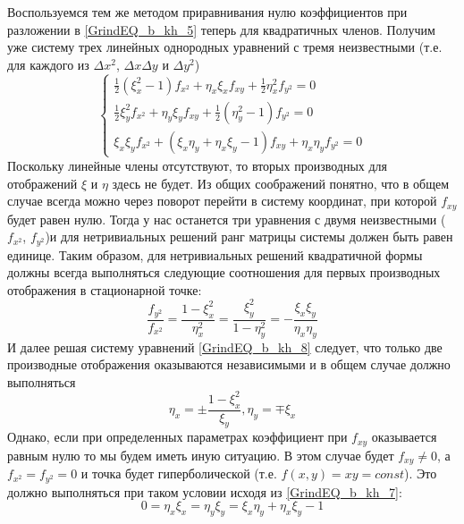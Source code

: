 \documentclass[a4paper]{article}
\begin{document}
	Воспользуемся тем же методом приравнивания нулю коэффициентов при разложении в \eqref{GrindEQ_b_kh_5} теперь для квадратичных членов. Получим уже систему трех линейных однородных уравнений с тремя неизвестными (т.е. для каждого из $\Delta x^2$, $\Delta x\Delta y$ и $\Delta y^2$)
\begin{equation} \label{GrindEQ_b_kh_7}
\begin{cases} \frac{1}{2} (\xi _x^2-1)f_{x^2}+\eta_x \xi_x f_{xy}+\frac{1}{2}\eta _x^2 f_{y^2}=0\\
\frac{1}{2} \xi _y^2 f_{x^2} + \eta_y \xi_y f_{xy}+\frac{1}{2}(\eta _y^2-1)f_{y^2}=0 \\
\xi_x \xi_y f_{x^2}+(\xi_x \eta_y+\eta_x \xi_y-1)f_{xy}+\eta_x \eta_y f_{y^2} =0
\end{cases}
\end{equation}
Поскольку линейные члены отсутствуют, то вторых производных для отображений $\xi$ и $\eta$ здесь не будет. Из общих соображений понятно, что в общем случае всегда можно через поворот перейти в систему координат, при которой $f_{xy}$ будет равен нулю. Тогда у нас останется три уравнения с двумя неизвестными ($f_{x^2}$, $f_{y^2}$)и для нетривиальных решений ранг матрицы системы должен быть равен единице. Таким образом, для нетривиальных решений квадратичной формы должны всегда выполняться следующие соотношения для первых производных отображения в стационарной точке:
\begin{equation} \label{GrindEQ_b_kh_8}
\frac{f_{y^2}}{f_{x^2}}=\frac{1-\xi _x^2}{\eta_x^2}=\frac{\xi_y^2}{1-\eta_y^2}=-\frac{\xi_x \xi_y}{\eta_x \eta_y}
\end{equation}
 И далее решая систему уравнений \eqref{GrindEQ_b_kh_8} следует, что только две  производные отображения оказываются независимыми и в общем случае должно выполняться
\begin{equation} \label{GrindEQ_b_kh_10}
\eta _x= \pm\frac{1-\xi _x^2}{\xi _y},\eta_y= \mp\xi_x
\end{equation}
Однако, если при определенных параметрах коэффициент при $f_{xy}$ оказывается равным нулю то мы будем иметь иную ситуацию. В этом случае будет $f_{xy}\neq0$, а $f_{x^2}=f_{y^2}=0$ и точка будет гиперболической (т.е. $f(x,y)=xy=const$).
Это должно выполняться при таком условии исходя из \eqref{GrindEQ_b_kh_7}:
\begin{equation} \label{GrindEQ_b_kh_9}
0=\eta_x \xi_x=\eta _y \xi _y=\xi _x \eta_y+\eta_x \xi_y-1
\end{equation}
\end{document}
